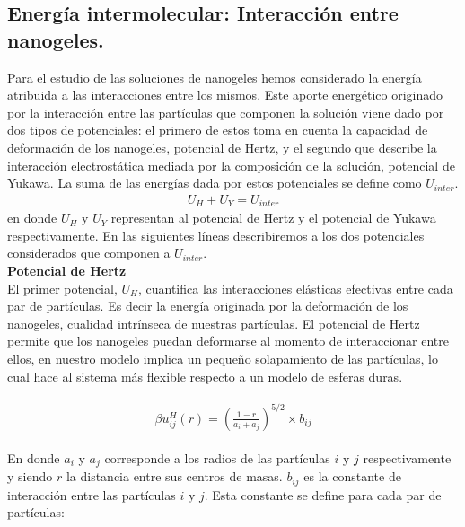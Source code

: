 	\subsection{Energ\'ia intermolecular: Interacci\'on entre nanogeles.}\label{sec:mc:energia_intra}
	
	Para el estudio de las soluciones de nanogeles hemos considerado la energ\'ia atribuida a las interacciones entre los mismos. Este aporte energ\'etico originado por la interacci\'on entre las part\'iculas que componen la soluci\'on viene dado por dos tipos de potenciales: el primero de estos toma en cuenta la capacidad de deformaci\'on de los nanogeles, potencial de Hertz, y el segundo que describe la interacci\'on electrost\'atica mediada por la composici\'on de la soluci\'on, potencial de Yukawa.
	La suma de las energ\'ias dada por estos potenciales se define como $U_{inter}$.
	\begin{align}
		U_H + U_Y = U_{inter}
		\label{eq:mc:u_inter}
	\end{align}
	\noindent en donde $U_H$ y $U_Y$ representan al potencial de Hertz y el  potencial de Yukawa respectivamente.
	En las siguientes l\'ineas describiremos a los dos potenciales considerados que componen a $U_{inter}$.\\
	
	\textbf{Potencial de Hertz} \\
	
	El primer potencial, $U_H$, cuantifica las interacciones el\'asticas efectivas entre cada par de part\'iculas. Es decir la energ\'ia originada por la deformaci\'on de los nanogeles, cualidad intr\'inseca de nuestras part\'iculas.  El potencial de Hertz permite que los nanogeles puedan deformarse al momento de interaccionar entre ellos, en nuestro modelo implica un peque\~no solapamiento de las part\'iculas, lo cual hace al sistema m\'as flexible respecto a un modelo de esferas duras. 
	
	\begin{align}
		\begin{aligned}
			\beta u^H_{ij} (r) = \left(\frac{1-r}{a_i + a_j}\right)^{5/2}\times b_{ij}
		\end{aligned}
		\label{eq:mc:hertz_ij}
	\end{align}
	
	\noindent En donde $a_i$ y $a_j$ corresponde a los radios de las part\'iculas $i$ y $j$ respectivamente y siendo $r$ la distancia entre sus centros de masas. $b_{ij}$ es la constante de interacci\'on entre las part\'iculas $i$ y $j$. Esta constante se define para cada par de part\'iculas:
	

